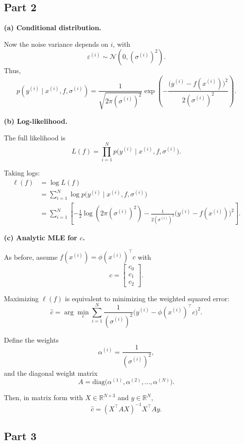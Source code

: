 \documentclass{article}
\begin{document}
\subsection{Part 2}

	\textbf{(a) Conditional distribution.}

	Now the noise variance depends on $i$, with
	\[
		\varepsilon^{(i)} \sim \mathcal{N}(0, (\sigma^{(i)})^2).
	\]
	Thus,
	\[
		p(y^{(i)} \mid x^{(i)}, f, \sigma^{(i)})
		= \frac{1}{\sqrt{2\pi(\sigma^{(i)})^2}}
		\exp\!\left( -\frac{\big(y^{(i)} - f(x^{(i)})\big)^2}{2(\sigma^{(i)})^2} \right).
	\]

	\textbf{(b) Log-likelihood.}

	The full likelihood is
	\[
		L(f) = \prod_{i=1}^N p\!\big(y^{(i)} \mid x^{(i)}, f, \sigma^{(i)}\big).
	\]

	Taking logs:
	\begin{align*}
		\ell(f) & = \log L(f)                                                            \\
		        & = \sum_{i=1}^N \log p\!\big(y^{(i)} \mid x^{(i)}, f, \sigma^{(i)}\big) \\
		        & = \sum_{i=1}^N \left[
			-\tfrac{1}{2}\log(2\pi (\sigma^{(i)})^2)
			- \tfrac{1}{2(\sigma^{(i)})^2}\big(y^{(i)} - f(x^{(i)})\big)^2
			\right].
	\end{align*}

	\textbf{(c) Analytic MLE for $c$.}

	As before, assume $f(x^{(i)}) = \phi(x^{(i)})^\top c$ with
	\[
		c =
		\begin{bmatrix}
			c_0 \\ c_1 \\ c_2
		\end{bmatrix}.
	\]

	Maximizing $\ell(f)$ is equivalent to minimizing the weighted squared error:
	\[
		\hat c = \arg\min_c \sum_{i=1}^N \frac{1}{(\sigma^{(i)})^2}
		\big(y^{(i)} - \phi(x^{(i)})^\top c\big)^2.
	\]

	Define the weights
	\[
		\alpha^{(i)} = \frac{1}{(\sigma^{(i)})^2},
	\]
	and the diagonal weight matrix
	\[
		A = \mathrm{diag}\!\big(\alpha^{(1)}, \alpha^{(2)}, \ldots, \alpha^{(N)}\big).
	\]

	Then, in matrix form with $X \in \mathbb{R}^{N \times 3}$ and $y \in \mathbb{R}^N$,
	\[
		\hat c = (X^\top A X)^{-1} X^\top A y.
	\]
    \pagebreak
\subsection{Part 3}
\end{document}
